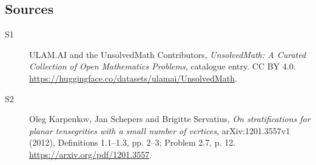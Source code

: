 \documentclass[11pt]{article}
\begin{document}
\subsection{Sources}
\begin{description}
\item[\hypertarget{source:statement:1}{S1}] ULAM.AI and the UnsolvedMath Contributors, \emph{UnsolvedMath: A Curated Collection of Open Mathematics Problems}, catalogue entry. CC BY 4.0. \url{https://huggingface.co/datasets/ulamai/UnsolvedMath}.
\item[\hypertarget{source:statement:2}{S2}] Oleg Karpenkov, Jan Schepers and Brigitte Servatius, \emph{On stratifications for planar tensegrities with a small number of vertices}, arXiv:1201.3557v1 (2012), Definitions 1.1--1.3, pp. 2--3; Problem 2.7, p. 12. \url{https://arxiv.org/pdf/1201.3557}.
\end{description}
\label{end:statement}
\end{document}
